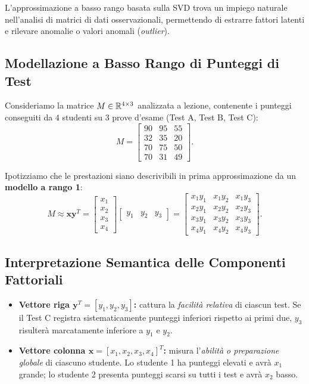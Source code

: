 L'approssimazione a basso rango basata sulla SVD trova un impiego naturale nell'analisi di matrici di dati osservazionali, permettendo di estrarre fattori latenti e rilevare anomalie o valori anomali (\textit{outlier}).

\subsection{Modellazione a Basso Rango di Punteggi di Test}

Consideriamo la matrice $M \in \mathbb{R}^{4 \times 3}$ analizzata a lezione, contenente i punteggi conseguiti da $4$ studenti su $3$ prove d'esame (Test A, Test B, Test C):
\begin{equation}
    M = \begin{bmatrix}
        90 & 95 & 55 \\
        32 & 35 & 20 \\
        70 & 75 & 50 \\
        70 & 31 & 49
    \end{bmatrix}.
\end{equation}

Ipotizziamo che le prestazioni siano descrivibili in prima approssimazione da un \textbf{modello a rango 1}:
\begin{equation}
    M \approx \mathbf{x} \mathbf{y}^T = \begin{bmatrix} x_1 \\ x_2 \\ x_3 \\ x_4 \end{bmatrix} \begin{bmatrix} y_1 & y_2 & y_3 \end{bmatrix} = \begin{bmatrix}
        x_1 y_1 & x_1 y_2 & x_1 y_3 \\
        x_2 y_1 & x_2 y_2 & x_2 y_3 \\
        x_3 y_1 & x_3 y_2 & x_3 y_3 \\
        x_4 y_1 & x_4 y_2 & x_4 y_3
    \end{bmatrix}.
\end{equation}

\subsection{Interpretazione Semantica delle Componenti Fattoriali}

\begin{itemize}
    \item \textbf{Vettore riga $\mathbf{y}^T = [y_1, y_2, y_3]$:} cattura la \textit{facilit\`a relativa} di ciascun test. Se il Test C registra sistematicamente punteggi inferiori rispetto ai primi due, $y_3$ risulter\`a marcatamente inferiore a $y_1$ e $y_2$.
    \item \textbf{Vettore colonna $\mathbf{x} = [x_1, x_2, x_3, x_4]^T$:} misura l'\textit{abilit\`a o preparazione globale} di ciascuno studente. Lo studente 1 ha punteggi elevati e avr\`a $x_1$ grande; lo studente 2 presenta punteggi scarsi su tutti i test e avr\`a $x_2$ basso.
\end{itemize}

